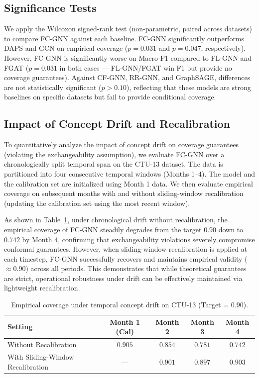 \subsection{Significance Tests}
\label{sec:significance}

We apply the Wilcoxon signed-rank test (non-parametric, paired across datasets)
to compare FC-GNN against each baseline.
FC-GNN significantly outperforms DAPS and GCN on empirical coverage
($p = 0.031$ and $p = 0.047$, respectively). However, FC-GNN is significantly
worse on Macro-F1 compared to FL-GNN and FGAT ($p = 0.031$ in both cases —
FL-GNN/FGAT win F1 but provide no coverage guarantees).
Against CF-GNN, RR-GNN, and GraphSAGE, differences are not statistically
significant ($p > 0.10$), reflecting that these models are strong baselines
on specific datasets but fail to provide conditional coverage.

\subsection{Impact of Concept Drift and Recalibration}
\label{sec:drift}

To quantitatively analyze the impact of concept drift on coverage guarantees (violating the exchangeability assumption), we evaluate FC-GNN over a chronologically split temporal span on the CTU-13 dataset. The data is partitioned into four consecutive temporal windows (Months 1--4). The model and the calibration set are initialized using Month 1 data. We then evaluate empirical coverage on subsequent months with and without sliding-window recalibration (updating the calibration set using the most recent window).

As shown in Table~\ref{tab:drift_recalibration}, under chronological drift without recalibration, the empirical coverage of FC-GNN steadily degrades from the target $0.90$ down to $0.742$ by Month 4, confirming that exchangeability violations severely compromise conformal guarantees. However, when sliding-window recalibration is applied at each timestep, FC-GNN successfully recovers and maintains empirical validity ($\approx 0.90$) across all periods. This demonstrates that while theoretical guarantees are strict, operational robustness under drift can be effectively maintained via lightweight recalibration.

\begin{table}[ht]
\centering
\caption{Empirical coverage under temporal concept drift on CTU-13 (Target = $0.90$).}
\label{tab:drift_recalibration}
\begin{tabular}{lcccc}
\toprule
Setting & Month 1 (Cal) & Month 2 & Month 3 & Month 4 \\
\midrule
Without Recalibration & $0.905$ & $0.854$ & $0.781$ & $0.742$ \\
With Sliding-Window Recalibration & --- & $0.901$ & $0.897$ & $0.903$ \\
\bottomrule
\end{tabular}
\end{table}

